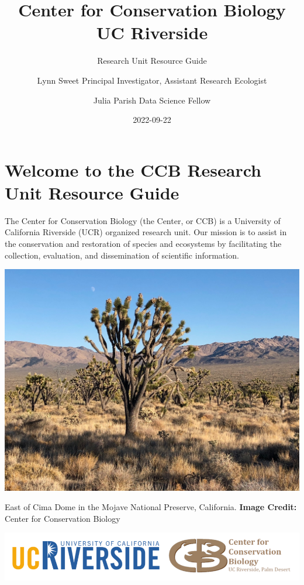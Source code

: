 \documentclass[
]{book}
\title{Center for Conservation Biology \textbar{} UC Riverside}
\subtitle{Research Unit Resource Guide}
\author{Lynn Sweet \textbar{} Principal Investigator, Assistant Research Ecologist \and Julia Parish \textbar{} Data Science Fellow}
\date{2022-09-22}
\begin{document}
\maketitle

{
\setcounter{tocdepth}{1}
\tableofcontents
}
\hypertarget{welcome-to-the-ccb-research-unit-resource-guide}{%
\chapter*{Welcome to the CCB Research Unit Resource Guide}\label{welcome-to-the-ccb-research-unit-resource-guide}}

The Center for Conservation Biology (the Center, or CCB) is a University of California Riverside (UCR) organized research unit. Our mission is to assist in the conservation and restoration of species and ecosystems by facilitating the collection, evaluation, and dissemination of scientific information.

\includegraphics[width=1\linewidth]{images/cima2019}

East of Cima Dome in the Mojave National Preserve, California.
\textbf{Image Credit:} Center for Conservation Biology

\begin{center}\includegraphics[width=0.75\linewidth]{images/ucrccb} \end{center}
\end{document}
